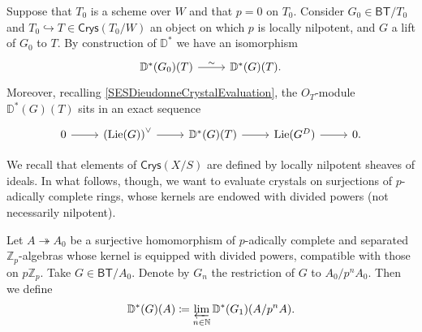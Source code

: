 \begin{rem}[]\label{rem:DGValuationRestriction}
	Suppose that $T_0$ is a scheme over $W$ and that $p = 0$ on $T_0$.
	Consider $G_0 \in \mathsf{BT}/T_0$ and $T_0 \hookrightarrow T \in \mathsf{Crys}(T_0/W)$
	an object on which $p$ is locally nilpotent, and $G$ a lift of $G_0$ to $T$.
	By construction of $\mathbb{D}^*$ we have an isomorphism
	\begin{equation*}
	\begin{tikzcd}[row sep = 0ex
		,/tikz/column 1/.append style={anchor=base east}
		,/tikz/column 2/.append style={anchor=base west}]
		\mathbb{D}^*(G_0)(T) \arrow[r, "\sim", rightarrow] &
		\mathbb{D}^*(G)(T)
	.\end{tikzcd}
	\end{equation*} 
	Moreover, recalling \cref{SESDieudonneCrystalEvaluation},
	the $O_{ T }$-module $\mathbb{D}^*(G)(T)$ sits in an exact sequence
	\begin{equation*}
	\begin{tikzcd}
		0 \arrow[r, "", rightarrow] &
		\left( \lie(G) \right)^\vee \arrow[r, "", rightarrow] &
		\mathbb{D}^*(G)(T) \arrow[r, "", rightarrow] &
		\lie(G^D) \arrow[r, "", rightarrow] &
		0
	.\end{tikzcd}
	\end{equation*}
\end{rem}


\noindent
We recall that elements of $\mathsf{Crys}(X/S)$ are defined by
locally nilpotent sheaves of ideals.
In what follows, though, we want to evaluate crystals on
surjections of $p$-adically complete rings, whose kernels are endowed with divided powers
(not necessarily nilpotent).
\begin{defn}[]\label{defn:NotNilpotentEvaluation}
	Let $A \twoheadrightarrow A_0$ be a surjective homomorphism
	of $p$-adically complete and separated $\mathbb{Z}_{p}$-algebras
	whose kernel is equipped with divided powers, compatible with those on $p \mathbb{Z}_{p}$.
	Take $G \in \mathsf{BT}/A_0$.
	Denote by $G_n$ the restriction of $G$ to $A_0/p^nA_0$.
	Then we define
	\begin{equation*}
		\mathbb{D}^*(G)(A) \coloneqq
		\varprojlim_{n \in \mathbb{N}} \mathbb{D}^*(G_1)(A/p^nA)
	.\end{equation*}
\end{defn}


